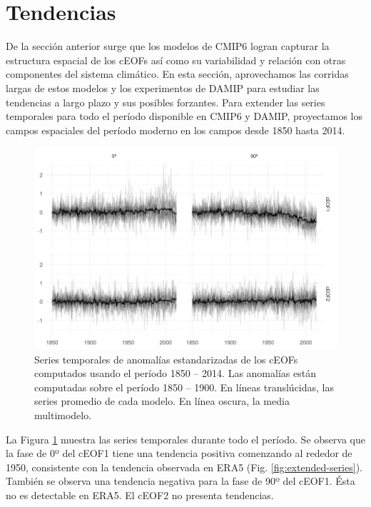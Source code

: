 \documentclass[12pt,oneside,a4paper]{reedthesis}
\begin{document}
\hypertarget{tendencias}{%
\section{Tendencias}\label{tendencias}}

De la sección anterior surge que los modelos de CMIP6 logran capturar la estructura espacial de los cEOFs así como su variabilidad y relación con otras componentes del sistema climático.
En esta sección, aprovechamos las corridas largas de estos modelos y los experimentos de DAMIP para estudiar las tendencias a largo plazo y sus posibles forzantes.
Para extender las series temporales para todo el período disponible en CMIP6 y DAMIP, proyectamos los campos espaciales del período moderno en los campos desde 1850 hasta 2014.

\begin{figure}

{\centering \includegraphics{figures/50-cmip6/series-largas-1} 

}

\caption{Series temporales de anomalías estandarizadas de los cEOFs computados usando el período 1850 -- 2014. Las anomalías están computadas sobre el período 1850 -- 1900. En líneas translúcidas, las series promedio de cada modelo. En línea oscura, la media multimodelo.}\label{fig:series-largas}
\end{figure}



La Figura \ref{fig:series-largas} muestra las series temporales durante todo el período.
Se observa que la fase de 0º del cEOF1 tiene una tendencia positiva comenzando al rededor de 1950, consistente con la tendencia observada en ERA5 (Fig. \ref{fig:extended-series}).
También se observa una tendencia negativa para la fase de 90º del cEOF1.
Ésta no es detectable en ERA5.
El cEOF2 no presenta tendencias.
\end{document}
